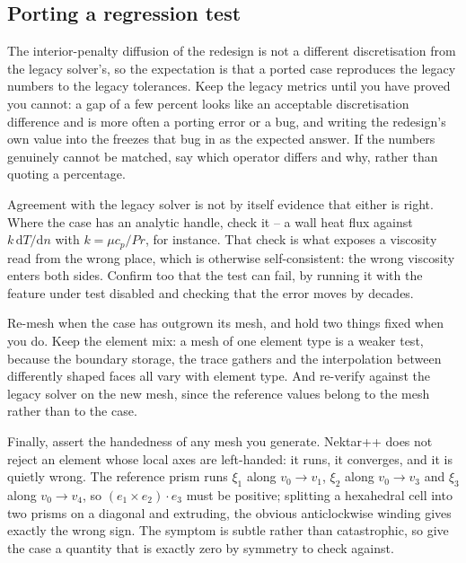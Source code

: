 \subsection*{Porting a regression test}
The interior-penalty diffusion of the redesign is not a different
discretisation from the legacy solver's, so the expectation is that a ported
case reproduces the legacy numbers to the legacy tolerances. Keep the legacy
metrics until you have proved you cannot: a gap of a few percent looks like an
acceptable discretisation difference and is more often a porting error or a
bug, and writing the redesign's own value into the  freezes that
bug in as the expected answer. If the numbers genuinely cannot be matched, say
which operator differs and why, rather than quoting a percentage.

Agreement with the legacy solver is not by itself evidence that either is
right. Where the case has an analytic handle, check it -- a wall heat flux
against $k\,\mathrm{d}T/\mathrm{d}n$ with $k = \mu c_p/\mathit{Pr}$, for
instance. That check is what exposes a viscosity read from the wrong place,
which is otherwise self-consistent: the wrong viscosity enters both sides.
Confirm too that the test can fail, by running it with the feature under test
disabled and checking that the error moves by decades.

Re-mesh when the case has outgrown its mesh, and hold two things fixed when
you do. Keep the element mix: a mesh of one element type is a weaker test,
because the boundary storage, the trace gathers and the interpolation between
differently shaped faces all vary with element type. And re-verify against the
legacy solver on the new mesh, since the reference values belong to the mesh
rather than to the case.

Finally, assert the handedness of any mesh you generate. Nektar++ does not
reject an element whose local axes are left-handed: it runs, it converges, and
it is quietly wrong. The reference prism runs $\xi_1$ along $v_0 \to v_1$,
$\xi_2$ along $v_0 \to v_3$ and $\xi_3$ along $v_0 \to v_4$, so
$(e_1 \times e_2) \cdot e_3$ must be positive; splitting a hexahedral cell
into two prisms on a diagonal and extruding, the obvious anticlockwise
winding gives exactly the wrong sign. The symptom is subtle rather than
catastrophic, so give the case a quantity that is exactly zero by symmetry to
check against.

